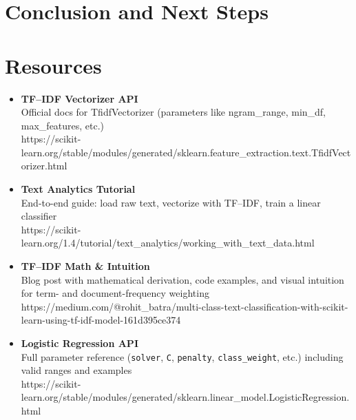 \documentclass[
  letterpaper,
  DIV=11,
  numbers=noendperiod]{scrartcl}
\begin{document}
\section{Conclusion and Next Steps}\label{conclusion-and-next-steps}

\section{Resources}\label{resources}

\begin{itemize}
\item
  \textbf{TF--IDF Vectorizer API}\\
  Official docs for TfidfVectorizer (parameters like ngram\_range,
  min\_df, max\_features, etc.)\\
  https://scikit-learn.org/stable/modules/generated/sklearn.feature\_extraction.text.TfidfVectorizer.html
\item
  \textbf{Text Analytics Tutorial}\\
  End-to-end guide: load raw text, vectorize with TF--IDF, train a
  linear classifier\\
  https://scikit-learn.org/1.4/tutorial/text\_analytics/working\_with\_text\_data.html
\item
  \textbf{TF--IDF Math \& Intuition}\\
  Blog post with mathematical derivation, code examples, and visual
  intuition for term- and document-frequency weighting\\
  https://medium.com/@rohit\_batra/multi-class-text-classification-with-scikit-learn-using-tf-idf-model-161d395ce374
\item
  \textbf{Logistic Regression API}\\
  Full parameter reference (\texttt{solver}, \texttt{C},
  \texttt{penalty}, \texttt{class\_weight}, etc.) including valid ranges
  and examples\\
  https://scikit-learn.org/stable/modules/generated/sklearn.linear\_model.LogisticRegression.html
\end{itemize}
\end{document}
